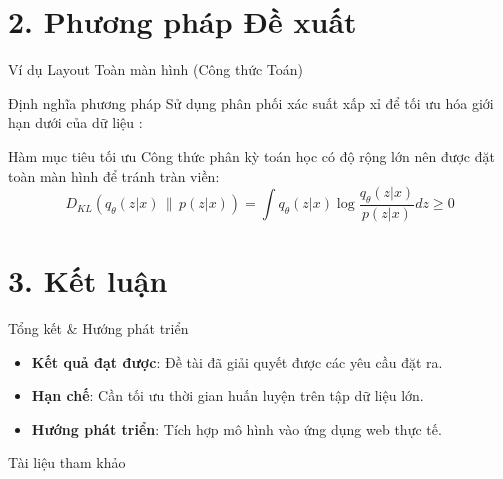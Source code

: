 \documentclass[10pt,aspectratio=169]{beamer}
\newcommand{\highlight}[1]{\textcolor{accent}{\bfseries #1}}
\newcommand{\kw}[1]{\textcolor{uitblue}{\bfseries #1}}
\begin{document}
\section{2. Phương pháp Đề xuất}

\begin{frame}{Ví dụ Layout Toàn màn hình (Công thức Toán)}
\begin{uitbox}{\faSearchPlus\; Định nghĩa phương pháp}
Sử dụng phân phối xác suất xấp xỉ để tối ưu hóa giới hạn dưới của dữ liệu \cite{kingma2013auto}:
\end{uitbox}
\vspace{0.2cm}
\begin{accentbox}{\faBalanceScale\; Hàm mục tiêu tối ưu}
Công thức phân kỳ toán học có độ rộng lớn nên được đặt toàn màn hình để tránh tràn viền:
$$D_{KL}(q_\theta(z|x) \,\|\, p(z|x)) = \int q_\theta(z|x) \log \frac{q_\theta(z|x)}{p(z|x)} dz \ge 0$$
\end{accentbox}
\end{frame}

\section{3. Kết luận}

\begin{frame}{Tổng kết \& Hướng phát triển}
\begin{itemize}
  \item \highlight{Kết quả đạt được}: Đề tài đã giải quyết được các yêu cầu đặt ra.
  \item \kw{Hạn chế}: Cần tối ưu thời gian huấn luyện trên tập dữ liệu lớn.
  \item \highlight{Hướng phát triển}: Tích hợp mô hình vào ứng dụng web thực tế.
\end{itemize}
\end{frame}

\begin{frame}[allowframebreaks]{Tài liệu tham khảo}
  
  
\end{frame}
\end{document}
